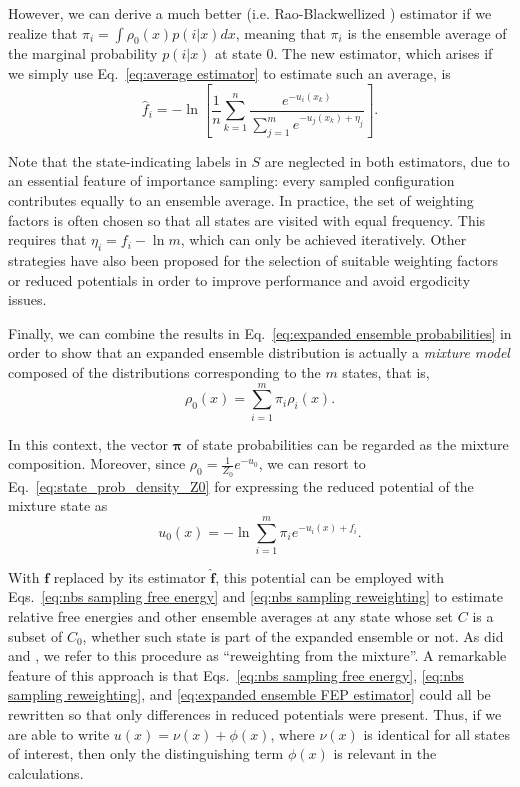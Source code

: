 \documentclass[journal=jctcce,manuscript=article,layout=twocolumn]{achemso}
\newcommand{\vt}[1]{\boldsymbol{\mathbf{#1}}}   %
\begin{document}
However, we can derive a much better (i.e. Rao-Blackwellized \cite{Carlson_2016, Ding_2017}) estimator if we realize that $\pi_i = \int \rho_0(x) p(i|x) dx$, meaning that $\pi_i$ is the ensemble average of the marginal probability $p(i|x)$ at state $0$. The new estimator, which arises if we simply use Eq.~\eqref{eq:average estimator} to estimate such an average, is
\begin{equation}
\label{eq:expanded ensemble FEP estimator}
\hat f_i = -\ln \left[ \frac{1}{n}\sum_{k=1}^n \frac{e^{-u_i(x_k)}}{\sum_{j=1}^m e^{-u_j(x_k) + \eta_j}} \right].
\end{equation}

Note that the state-indicating labels in $S$ are neglected in both estimators, due to an essential feature of importance sampling: every sampled configuration contributes equally to an ensemble average. In practice, the set of weighting factors is often chosen so that all states are visited with equal frequency. This requires that $\eta_i = f_i - \ln m$, which can only be achieved iteratively. Other strategies have also been proposed\cite{Katzgraber_2006, Trebst_2006, Escobedo_2007, Escobedo_2008, Martinez_2008} for the selection of suitable weighting factors or reduced potentials in order to improve performance and avoid ergodicity issues.

Finally, we can combine the results in Eq.~\eqref{eq:expanded ensemble probabilities} in order to show that an expanded ensemble distribution is actually a \textit{mixture model} \cite{Lindsay_1995, Marin_2005} composed of the distributions corresponding to the $m$ states, that is,
\begin{equation}
\label{eq:mixture ensemble}
\rho_0(x) = \sum_{i=1}^m \pi_i \rho_i(x).
\end{equation}

In this context, the vector $\vt \pi$ of state probabilities can be regarded as the mixture composition. Moreover, since $\rho_0 = \frac{1}{Z_0}e^{-u_0}$, we can resort to Eq.~\eqref{eq:state_prob_density_Z0} for expressing the reduced potential of the mixture state as
\begin{equation}
\label{eq:mixture potential}
u_0(x) = -\ln \sum_{i=1}^m \pi_i e^{-u_i(x) + f_i}.
\end{equation}

With $\vt f$ replaced by its estimator $\hat{\vt f}$, this potential can be employed with Eqs.~\eqref{eq:nbs sampling free energy} and \eqref{eq:nbs sampling reweighting} to estimate relative free energies and other ensemble averages at any state whose set $C$ is a subset of $C_0$, whether such state is part of the expanded ensemble or not. As did \citeauthor{Geyer_1994} \cite{Geyer_1994} and \citeauthor{Shirts_2017} \cite{Shirts_2017}, we refer to this procedure as ``reweighting from the mixture''. A remarkable feature of this approach is that Eqs.~\eqref{eq:nbs sampling free energy}, \eqref{eq:nbs sampling reweighting}, and \eqref{eq:expanded ensemble FEP estimator} could all be rewritten so that only differences in reduced potentials were present. Thus, if we are able to write $u(x) = \nu(x) + \phi(x)$, where $\nu(x)$ is identical for all states of interest, then only the distinguishing term $\phi(x)$ is relevant in the calculations.
\end{document}
